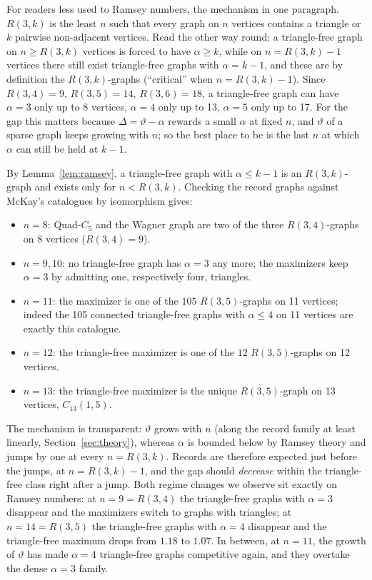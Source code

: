 \documentclass[11pt]{article}
\renewcommand{\theta}{\vartheta}
\newcommand{\gap}{\Delta}
\begin{document}
For readers less used to Ramsey numbers, the mechanism in one paragraph. $R(3,k)$ is the least $n$ such that every graph on $n$ vertices contains a triangle or $k$ pairwise non-adjacent vertices. Read the other way round: a triangle-free graph on $n\ge R(3,k)$ vertices is forced to have $\alpha\ge k$, while on $n=R(3,k)-1$ vertices there still exist triangle-free graphs with $\alpha=k-1$, and these are by definition the $R(3,k)$-graphs (``critical'' when $n=R(3,k)-1$). Since $R(3,4)=9$, $R(3,5)=14$, $R(3,6)=18$, a triangle-free graph can have $\alpha=3$ only up to 8 vertices, $\alpha=4$ only up to 13, $\alpha=5$ only up to 17. For the gap this matters because $\gap=\theta-\alpha$ rewards a small $\alpha$ at fixed $n$, and $\theta$ of a sparse graph keeps growing with $n$; so the best place to be is the last $n$ at which $\alpha$ can still be held at $k-1$.

By Lemma~\ref{lem:ramsey}, a triangle-free graph with $\alpha\le k-1$ is an $R(3,k)$-graph and exists only for $n<R(3,k)$. Checking the record graphs against McKay's catalogues by isomorphism gives:
\begin{itemize}
\item $n=8$: Quad-$C_5$ and the Wagner graph are two of the three $R(3,4)$-graphs on 8 vertices ($R(3,4)=9$).
\item $n=9,10$: no triangle-free graph has $\alpha=3$ any more; the maximizers keep $\alpha=3$ by admitting one, respectively four, triangles.
\item $n=11$: the maximizer is one of the $105$ $R(3,5)$-graphs on 11 vertices; indeed the 105 connected triangle-free graphs with $\alpha\le4$ on 11 vertices are exactly this catalogue.
\item $n=12$: the triangle-free maximizer is one of the $12$ $R(3,5)$-graphs on 12 vertices.
\item $n=13$: the triangle-free maximizer is the unique $R(3,5)$-graph on 13 vertices, $C_{13}(1,5)$.
\end{itemize}
The mechanism is transparent: $\theta$ grows with $n$ (along the record family at least linearly, Section~\ref{sec:theory}), whereas $\alpha$ is bounded below by Ramsey theory and jumps by one at every $n=R(3,k)$. Records are therefore expected just before the jumps, at $n=R(3,k)-1$, and the gap should \emph{decrease} within the triangle-free class right after a jump. Both regime changes we observe sit exactly on Ramsey numbers: at $n=9=R(3,4)$ the triangle-free graphs with $\alpha=3$ disappear and the maximizers switch to graphs with triangles; at $n=14=R(3,5)$ the triangle-free graphs with $\alpha=4$ disappear and the triangle-free maximum drops from $1.18$ to $1.07$. In between, at $n=11$, the growth of $\theta$ has made $\alpha=4$ triangle-free graphs competitive again, and they overtake the dense $\alpha=3$ family.
\end{document}
